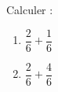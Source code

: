 
\begin{mental}
    Calculer :
    \begin{enumerate}
        \item
            \( \dfrac{ 2 }{ 6 }+\dfrac{ 1 }{ 6 }\)
        \item
            \( \dfrac{ 2 }{ 6 }+\dfrac{ 4 }{ 6 }\)
    \end{enumerate}
\end{mental}
